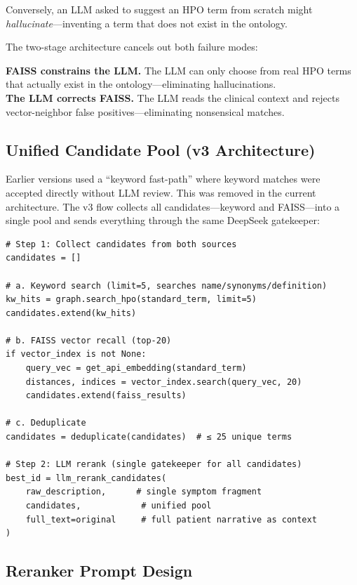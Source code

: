 \documentclass[11pt,a4paper]{article}
\begin{document}
Conversely, an LLM asked to suggest an HPO term from scratch might \textit{hallucinate}—inventing a term that does not exist in the ontology.

The two-stage architecture cancels out both failure modes:

\begin{callout}
\textbf{FAISS constrains the LLM.} The LLM can only choose from real HPO terms that actually exist in the ontology—eliminating hallucinations.\\
\textbf{The LLM corrects FAISS.} The LLM reads the clinical context and rejects vector-neighbor false positives—eliminating nonsensical matches.
\end{callout}

\subsection{Unified Candidate Pool (v3 Architecture)}

Earlier versions used a ``keyword fast-path'' where keyword matches were accepted directly without LLM review. This was removed in the current architecture. The v3 flow collects all candidates—keyword and FAISS—into a single pool and sends everything through the same DeepSeek gatekeeper:

\begin{lstlisting}[caption={Unified candidate collection (per symptom)}]
# Step 1: Collect candidates from both sources
candidates = []

# a. Keyword search (limit=5, searches name/synonyms/definition)
kw_hits = graph.search_hpo(standard_term, limit=5)
candidates.extend(kw_hits)

# b. FAISS vector recall (top-20)
if vector_index is not None:
    query_vec = get_api_embedding(standard_term)
    distances, indices = vector_index.search(query_vec, 20)
    candidates.extend(faiss_results)

# c. Deduplicate
candidates = deduplicate(candidates)  # ≤ 25 unique terms

# Step 2: LLM rerank (single gatekeeper for all candidates)
best_id = llm_rerank_candidates(
    raw_description,      # single symptom fragment
    candidates,            # unified pool
    full_text=original     # full patient narrative as context
)
\end{lstlisting}

\subsection{Reranker Prompt Design}
\end{document}
